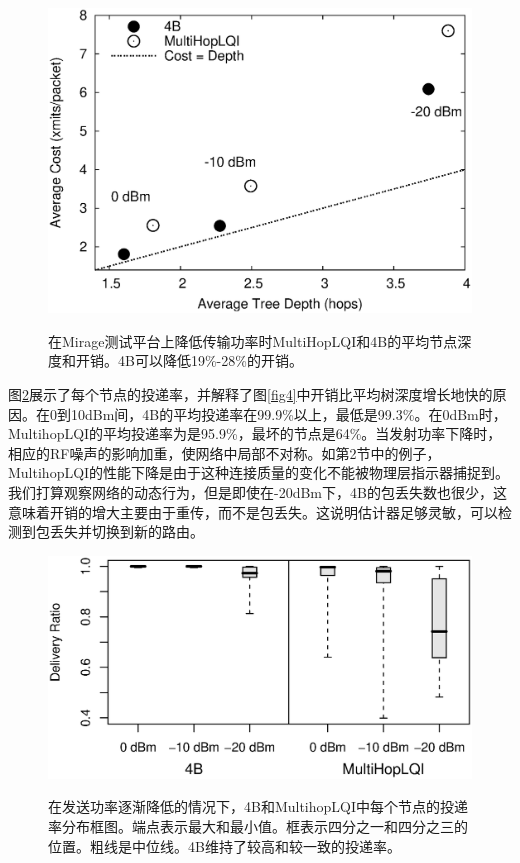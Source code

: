 \documentclass[12pt,a4paper]{article}
\begin{document}
\begin{figure}[ht]
\centering
\includegraphics[scale=0.5]{figures/fig7}\label{fig7}
\caption{在Mirage测试平台上降低传输功率时MultiHopLQI和4B的平均节点深度和开销。4B可以降低19\%-28\%的开销。}
\end{figure}


图\ref{fig8}展示了每个节点的投递率，并解释了图\ref{fig4}中开销比平均树深度增长地快的原因。在0到10dBm间，4B的平均投递率在99.9\%以上，最低是99.3\%。在0dBm时，MultihopLQI的平均投递率为是95.9\%，最坏的节点是64\%。当发射功率下降时，相应的RF噪声的影响加重，使网络中局部不对称。如第2节中的例子，MultihopLQI的性能下降是由于这种连接质量的变化不能被物理层指示器捕捉到。我们打算观察网络的动态行为，但是即使在-20dBm下，4B的包丢失数也很少，这意味着开销的增大主要由于重传，而不是包丢失。这说明估计器足够灵敏，可以检测到包丢失并切换到新的路由。

\begin{figure}[ht]
\centering
\includegraphics[scale=0.5]{figures/fig8}\label{fig8}
\caption{在发送功率逐渐降低的情况下，4B和MultihopLQI中每个节点的投递率分布框图。端点表示最大和最小值。框表示四分之一和四分之三的位置。粗线是中位线。4B维持了较高和较一致的投递率。}
\end{figure}
\end{document}
